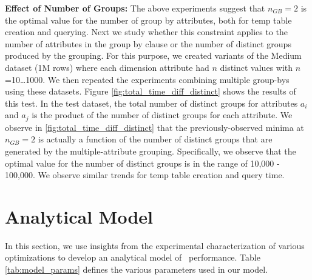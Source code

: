 {\bf Effect of Number of Groups:} The above experiments suggest that $n_{GB}=2$
is the optimal value for the number of group by attributes, both for temp table
creation and querying.
Next we study whether this constraint applies to the number of attributes in the
group by clause or the number of distinct groups produced by the grouping. For
this purpose, we created variants of the Medium dataset (1M rows) where each
dimension attribute had $n$ distinct values with $n$=10\ldots1000. We then
repeated the experiments combining multiple group-bys using these datasets.
Figure \ref{fig:total_time_diff_distinct} shows the results of this test. In the
test dataset, the total number of distinct groups for attributes $a_i$ and $a_j$
is the product of the number of distinct groups for each attribute. We observe
in \ref{fig:total_time_diff_distinct} that the previously-observed minima at
$n_{GB}=2$ is actually a function of the number of distinct groups that are
generated by the multiple-attribute grouping.
Specifically, we observe that the optimal value for the number of distinct
groups is in the range of 10,000 - 100,000. We observe similar trends for temp
table creation and query time.



\section{Analytical Model}
\label{sec:model}
In this section, we use insights from the experimental characterization of
various optimizations to develop an analytical model of \SeeDB\ performance.
Table \ref{tab:model_params} defines the various parameters used in our model.

